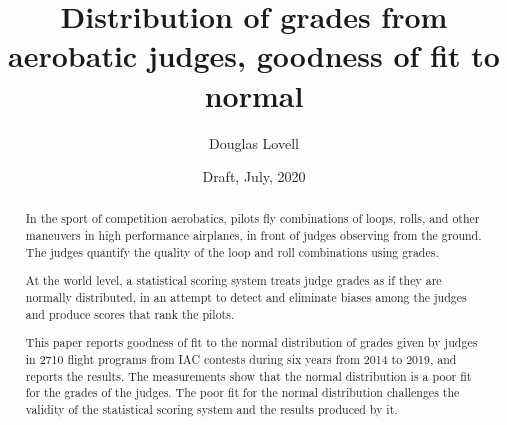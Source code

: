 \documentclass[10pt,twocolumn]{article}
\title{Distribution of grades from aerobatic judges, goodness of fit to normal}
\author{Douglas Lovell}
\date{Draft, July, 2020}
\begin{document}
\maketitle
\begin{abstract}
  In the sport of competition aerobatics, pilots fly combinations of loops,
  rolls, and other maneuvers in high performance airplanes, in front of
  judges observing from the ground.
  The judges quantify the quality of the loop and roll combinations
  using grades.

  At the world level, a statistical
  scoring system treats judge grades as if they are normally distributed,
  in an attempt to detect and eliminate biases among the judges
  and produce scores that rank the pilots.

  This paper reports goodness of fit to the normal distribution of
  grades given by judges in 2710 flight programs from IAC contests
  during six years from 2014 to 2019, and reports the results.
  The measurements show that the normal distribution is a poor fit for
  the grades of the judges. The poor fit for the normal distribution challenges
  the validity of the statistical scoring system and the results produced
  by it.
\end{abstract}












\end{document}
